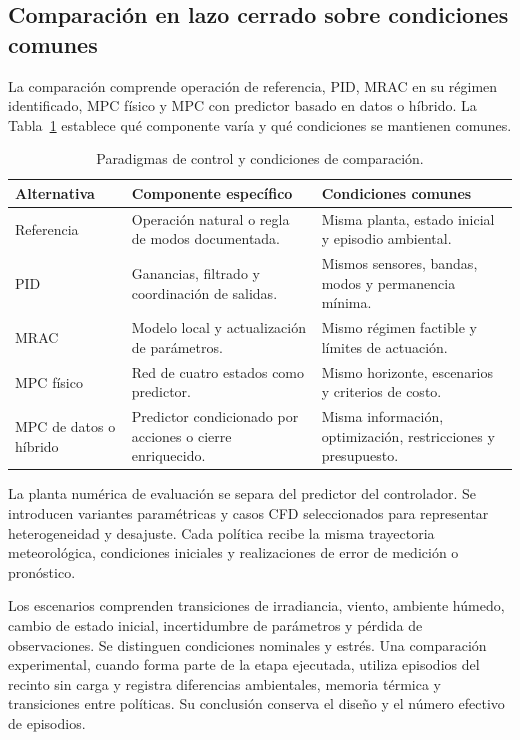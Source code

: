 \subsection{Comparación en lazo cerrado sobre condiciones comunes}
\label{met:comparacion_control}

La comparación comprende operación de referencia, PID, MRAC en su régimen identificado, MPC físico y MPC con predictor basado en datos o híbrido. La Tabla~\ref{met:tabla_control} establece qué componente varía y qué condiciones se mantienen comunes.

\begin{table}[htbp]
\centering
\small
\caption{Paradigmas de control y condiciones de comparación.}
\label{met:tabla_control}
\begingroup
\renewcommand{\arraystretch}{1.28}
\begin{tabularx}{\textwidth}{>{\raggedright\arraybackslash}p{}>{\raggedright\arraybackslash}p{}>{\raggedright\arraybackslash}X}
\toprule
Alternativa & Componente específico & Condiciones comunes \\
\midrule
Referencia & Operación natural o regla de modos documentada. & Misma planta, estado inicial y episodio ambiental. \\
PID & Ganancias, filtrado y coordinación de salidas. & Mismos sensores, bandas, modos y permanencia mínima. \\
MRAC & Modelo local y actualización de parámetros. & Mismo régimen factible y límites de actuación. \\
MPC físico & Red de cuatro estados como predictor. & Mismo horizonte, escenarios y criterios de costo. \\
MPC de datos o híbrido & Predictor condicionado por acciones o cierre enriquecido. & Misma información, optimización, restricciones y presupuesto. \\
\bottomrule
\end{tabularx}
\endgroup
\end{table}

La planta numérica de evaluación se separa del predictor del controlador. Se introducen variantes paramétricas y casos CFD seleccionados para representar heterogeneidad y desajuste. Cada política recibe la misma trayectoria meteorológica, condiciones iniciales y realizaciones de error de medición o pronóstico.

Los escenarios comprenden transiciones de irradiancia, viento, ambiente húmedo, cambio de estado inicial, incertidumbre de parámetros y pérdida de observaciones. Se distinguen condiciones nominales y estrés. Una comparación experimental, cuando forma parte de la etapa ejecutada, utiliza episodios del recinto sin carga y registra diferencias ambientales, memoria térmica y transiciones entre políticas. Su conclusión conserva el diseño y el número efectivo de episodios.

